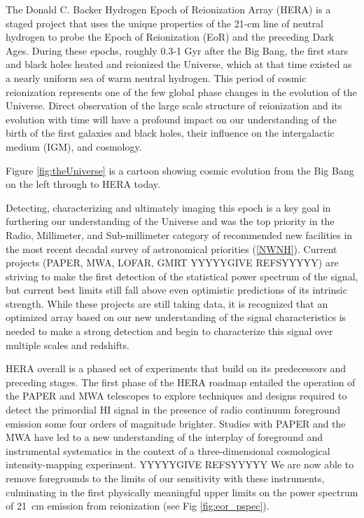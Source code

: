\documentclass[ars]{/Users/daviddeboer1/Documents/Papers/Copernicus_LaTeX_Package_v_2_7/copernicus}
\begin{document}
\introduction  %
\label{sec:intro}
The Donald C. Backer Hydrogen Epoch of Reionization Array (HERA) is a staged project
that uses the unique properties of the 21-cm line of neutral hydrogen to probe the
Epoch of Reionization (EoR) and the preceding Dark Ages. During these epochs, roughly
0.3-1 Gyr after the Big Bang, the first stars and black holes heated and reionized
the Universe, which at that time existed as a nearly uniform sea of warm neutral
hydrogen.   This period of cosmic reionization represents one of the few global
phase changes in the evolution of the Universe.
Direct observation of the large scale structure of reionization and its
evolution with time will have a profound impact on our understanding of the birth of
the first galaxies and black holes, their influence on the intergalactic medium
(IGM), and cosmology.

Figure \ref{fig:theUniverse} is a cartoon showing cosmic evolution from the Big Bang on the left through
to HERA today.

Detecting, characterizing and ultimately imaging this epoch is a key goal in
furthering our understanding of the Universe and was the top priority in the Radio,
Millimeter, and Sub-millimeter category of recommended new facilities in the most
recent decadal survey of astronomical priorities (\ref{NWNH}). Current projects
(PAPER, MWA, LOFAR, GMRT YYYYYGIVE REFSYYYYY) are striving to make the first detection of the statistical
power spectrum of the signal, but current best limits still fall above even
optimistic predictions of its intrinsic strength. While these projects are still
taking data, it is recognized that an optimized array based on our new understanding
of the signal characteristics is needed to make a strong detection and begin to
characterize this signal over multiple scales and redshifts.

HERA overall is a phased set of experiments that build on its predecessors and preceding stages.
The first phase of the HERA roadmap entailed the operation of the
PAPER and MWA telescopes to explore techniques and designs required to
detect the primordial HI signal in the presence of radio continuum
foreground emission some four orders of magnitude brighter. Studies
with PAPER and the MWA have led to a new understanding of the
interplay of foreground and instrumental systematics in the context of
a three-dimensional cosmological intensity-mapping experiment.  YYYYYGIVE REFSYYYYY 
We are
now able to remove foregrounds to the limits of our sensitivity with
these instruments, culminating in the first physically meaningful
upper limits on the power spectrum of 21~cm emission from
reionization (see Fig \ref{fig:eor_pspec}).
\end{document}
